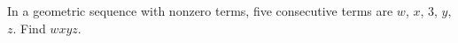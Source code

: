 In a geometric sequence with nonzero terms, five consecutive terms are $w$, $x$, $3$, $y$, $z$. Find $wxyz$.
